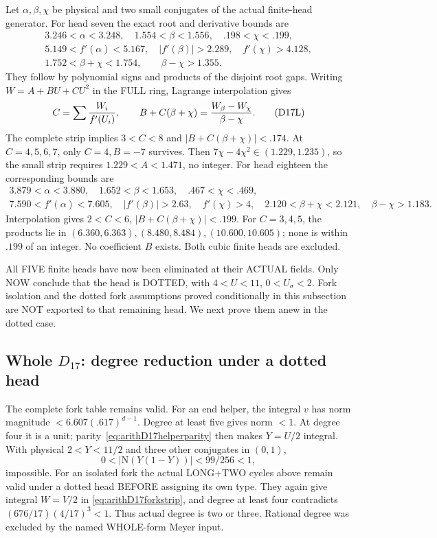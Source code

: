 Let \(\alpha,\beta,\chi\) be physical and two
small conjugates of the actual finite-head generator.
For head seven the exact root and derivative
bounds are
\[
 \begin{gathered}
3.246<\alpha<3.248,\quad1.554<\beta<1.556,\quad
 .198<\chi<.199,\\
5.149<f'(\alpha)<5.167,\quad|f'(\beta)|>2.289,\quad
 f'(\chi)>4.128,\\
1.752<\beta+\chi<1.754,\qquad\beta-\chi>1.355 .
 \end{gathered}
\]
They follow by polynomial signs and products
of the disjoint root gaps.
Writing \(W=A+BU+CU^2\) in the FULL ring,
Lagrange interpolation gives
\[
 C=\sum {W_i\over f'(U_i)},\qquad
 B+C(\beta+\chi)={W_\beta-W_\chi\over\beta-\chi}.
\tag{D17L}\label{eq:arithD17interpolation}
\]
The complete strip implies \(3<C<8\) and
\(|B+C(\beta+\chi)|<.174\).
At \(C=4,5,6,7\), only \(C=4,B=-7\) survives.
Then \(7\chi-4\chi^2\in(1.229,1.235)\),
so the small strip requires \(1.229<A<1.471\),
no integer.
For head eighteen the corresponding bounds are
\[
 \begin{gathered}
3.879<\alpha<3.880,\quad1.652<\beta<1.653,\quad
 .467<\chi<.469,\\
7.590<f'(\alpha)<7.605,\quad|f'(\beta)|>2.63,\quad
 f'(\chi)>4,\quad
2.120<\beta+\chi<2.121,\quad\beta-\chi>1.183 .
 \end{gathered}
\]
Interpolation gives \(2<C<6\),
\(|B+C(\beta+\chi)|<.199\).
For \(C=3,4,5\), the products lie in
\((6.360,6.363),(8.480,8.484),(10.600,10.605)\);
none is within \(.199\) of an integer.
No coefficient \(B\) exists.
Both cubic finite heads are excluded.

All FIVE finite heads have now been eliminated
at their ACTUAL fields.
Only NOW conclude that the head is DOTTED,
with \(4<U<11\), \(0<U_\sigma<2\).
Fork isolation and the dotted fork assumptions
proved conditionally in this subsection are NOT
exported to that remaining head.
We next prove them anew in the dotted case.

\subsection{Whole \(D_{17}\): degree reduction under a dotted head}
\label{app:arithD17degrees}

The complete fork table remains valid.
For an end helper, the integral \(v\) has norm
magnitude \(<6.607(.617)^{d-1}\).
Degree at least five gives norm \(<1\).
At degree four it is a unit;
parity~\eqref{eq:arithD17helperparity} then makes
\(Y=U/2\) integral.
With physical \(2<Y<11/2\) and three other
conjugates in \((0,1)\),
\[
                 0<|\mathrm N(Y(1-Y))|<99/256<1,
\]
impossible.
For an isolated fork the actual LONG+TWO
cycles above remain valid under a dotted head
BEFORE assigning its own type.
They again give integral \(W=V/2\) in
\eqref{eq:arithD17forkstrip}, and degree at least
four contradicts
\((676/17)(4/17)^3<1\).
Thus actual degree is two or three.
Rational degree was excluded by the named
WHOLE-form Meyer input.

